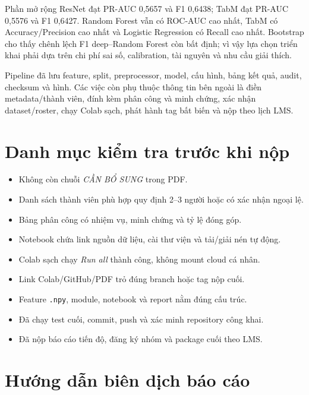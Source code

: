 \documentclass[12pt,a4paper,oneside]{report}
\newcommand{\code}[1]{\texttt{#1}}
\begin{document}
Phần mở rộng ResNet đạt PR-AUC 0,5657 và F1 0,6438; TabM đạt PR-AUC 0,5576 và F1 0,6427. Random Forest vẫn có ROC-AUC cao nhất, TabM có Accuracy/Precision cao nhất và Logistic Regression có Recall cao nhất. Bootstrap cho thấy chênh lệch F1 deep--Random Forest còn bất định; vì vậy lựa chọn triển khai phải dựa trên chi phí sai số, calibration, tài nguyên và nhu cầu giải thích.

Pipeline đã lưu feature, split, preprocessor, model, cấu hình, bảng kết quả, audit, checksum và hình. Các việc còn phụ thuộc thông tin bên ngoài là điền metadata/thành viên, đính kèm phân công và minh chứng, xác nhận dataset/roster, chạy Colab sạch, phát hành tag bất biến và nộp theo lịch LMS.

\appendix
\chapter{Danh mục kiểm tra trước khi nộp}

\begin{itemize}
  \item[$\square$] Không còn chuỗi \textit{CẦN BỔ SUNG} trong PDF.
  \item[$\square$] Danh sách thành viên phù hợp quy định 2--3 người hoặc có xác nhận ngoại lệ.
  \item[$\square$] Bảng phân công có nhiệm vụ, minh chứng và tỷ lệ đóng góp.
  \item[$\square$] Notebook chứa link nguồn dữ liệu, cài thư viện và tải/giải nén tự động.
  \item[$\square$] Colab sạch chạy \textit{Run all} thành công, không mount cloud cá nhân.
  \item[$\square$] Link Colab/GitHub/PDF trỏ đúng branch hoặc tag nộp cuối.
  \item[$\square$] Feature \code{.npy}, module, notebook và report nằm đúng cấu trúc.
  \item[$\square$] Đã chạy test cuối, commit, push và xác minh repository công khai.
  \item[$\square$] Đã nộp báo cáo tiến độ, đăng ký nhóm và package cuối theo LMS.
\end{itemize}

\chapter{Hướng dẫn biên dịch báo cáo}
\end{document}
